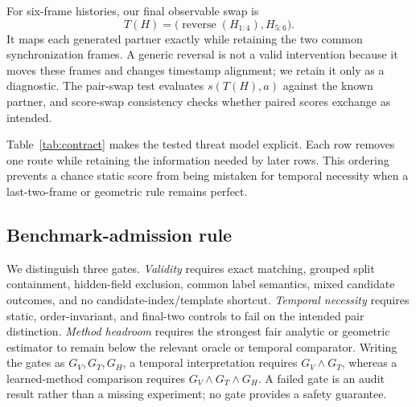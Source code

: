 \documentclass[letterpaper,10pt,conference]{ieeeconf}
\begin{document}
For six-frame histories, our final observable swap is
\begin{equation}
T(H)=\bigl(\operatorname{reverse}(H_{1:4}), H_{5:6}\bigr).
\end{equation}
It maps each generated partner exactly while retaining the two common
synchronization frames. A generic reversal is not a valid intervention because
it moves these frames and changes timestamp alignment; we retain it only as a
diagnostic. The pair-swap test evaluates $s(T(H),a)$ against the known partner,
and score-swap consistency checks whether paired scores exchange as intended.

Table~\ref{tab:contract} makes the tested threat model explicit. Each row
removes one route while retaining the information needed by later rows. This
ordering prevents a chance static score from being mistaken for temporal
necessity when a last-two-frame or geometric rule remains perfect.

\begin{table}[t]
    \centering
    \caption{Observable contract and corresponding rejection test.}
    \label{tab:contract}
\end{table}

\subsection{Benchmark-admission rule}

We distinguish three gates. \emph{Validity} requires exact matching, grouped
split containment, hidden-field exclusion, common label semantics, mixed
candidate outcomes, and no candidate-index/template shortcut. \emph{Temporal
necessity} requires static, order-invariant, and final-two controls to fail on
the intended pair distinction. \emph{Method headroom} requires the strongest
fair analytic or geometric estimator to remain below the relevant oracle or
temporal comparator. Writing the gates as $G_V,G_T,G_H$, a temporal
interpretation requires $G_V\wedge G_T$, whereas a learned-method comparison
requires $G_V\wedge G_T\wedge G_H$. A failed gate is an audit result rather
than a missing experiment; no gate provides a safety guarantee.
\end{document}

